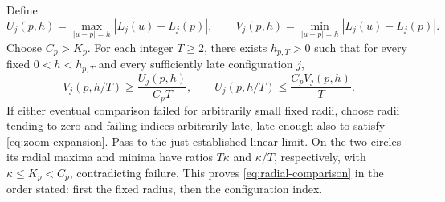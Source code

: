 Define
\[
 U_j(p,h)=\max_{|u-p|=h}|L_j(u)-L_j(p)|,
 \qquad
 V_j(p,h)=\min_{|u-p|=h}|L_j(u)-L_j(p)|.
\]
Choose $C_p>K_p$.  For each integer $T\ge2$, there exists
$h_{p,T}>0$ such that for every fixed $0<h<h_{p,T}$ and every
sufficiently late configuration $j$,
\begin{equation}\label{eq:radial-comparison}
 V_j(p,h/T)\ge\frac{U_j(p,h)}{C_p T},
 \qquad
 U_j(p,h/T)\le\frac{C_p V_j(p,h)}{T}.
\end{equation}
If either eventual comparison failed for arbitrarily small fixed
radii, choose radii tending to zero and failing indices arbitrarily
late, late enough also to satisfy \eqref{eq:zoom-expansion}.  Pass to the just-established
linear limit.  On the two circles its radial maxima and minima have
ratios $T\kappa$ and $\kappa/T$, respectively, with
$\kappa\le K_p<C_p$, contradicting failure.  This proves \eqref{eq:radial-comparison} in the
order stated: first the fixed radius, then the configuration index.
